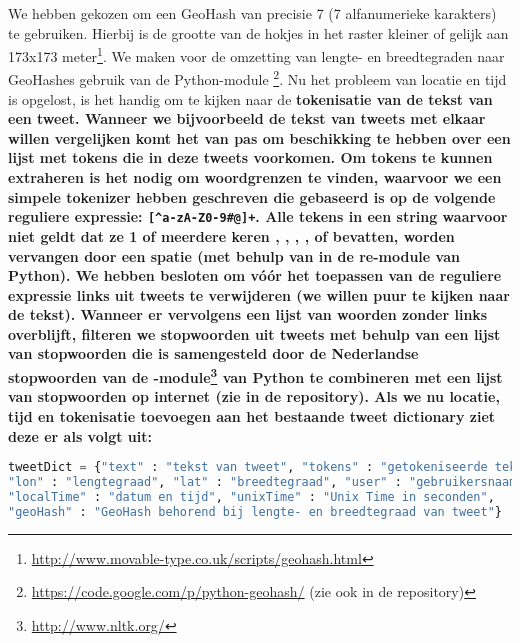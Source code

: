 {{We hebben gekozen om een GeoHash van precisie 7 (7 alfanumerieke karakters) te gebruiken. 
Hierbij is de grootte van de hokjes in het raster kleiner of gelijk aan 173x173 
meter\footnote{\url{http://www.movable-type.co.uk/scripts/geohash.html}}. We maken voor de omzetting van lengte- en breedtegraden naar GeoHashes 
gebruik van de Python-module \footnote{\url{https://code.google.com/p/python-geohash/} (zie ook  in de repository)}.
\vl
Nu het probleem van locatie en tijd is opgelost, is het handig om te kijken naar 
de \bf{tokenisatie} van de tekst van een tweet. Wanneer we bijvoorbeeld de tekst van 
tweets met elkaar willen vergelijken komt het van pas om beschikking te hebben 
over een lijst met tokens die in deze tweets voorkomen. Om tokens te kunnen 
extraheren is het nodig om woordgrenzen te vinden, waarvoor we een simpele 
tokenizer hebben geschreven die gebaseerd is op de volgende reguliere expressie: 
\verb|[^a-zA-Z0-9#@]+|. Alle tekens in een string waarvoor niet geldt dat ze 1 of 
meerdere keren , , , \ttt{\#}, of  bevatten, worden vervangen door een spatie 
(met behulp van  in de {re}-module van Python). We hebben besloten om 
vóór het toepassen van de reguliere expressie links uit tweets te verwijderen 
(we willen puur te kijken naar de tekst). Wanneer er vervolgens een lijst van 
woorden zonder links overblijft, filteren we stopwoorden uit tweets met behulp 
van een lijst van stopwoorden die is samengesteld door de Nederlandse 
stopwoorden van de -module\footnote{\url{http://www.nltk.org/}} van Python te combineren met een lijst van 
stopwoorden op internet (zie  in de repository).
\vl
Als we nu locatie, tijd en tokenisatie toevoegen aan het bestaande tweet 
dictionary ziet deze er als volgt uit:

\begin{lstlisting}[language=Python]
tweetDict = {"text" : "tekst van tweet", "tokens" : "getokeniseerde tekst", 
"lon" : "lengtegraad", "lat" : "breedtegraad", "user" : "gebruikersnaam", 
"localTime" : "datum en tijd", "unixTime" : "Unix Time in seconden", 
"geoHash" : "GeoHash behorend bij lengte- en breedtegraad van tweet"}
\end{lstlisting}
\vspace*{-10pt}

\label{ClusterCreator}

}}
